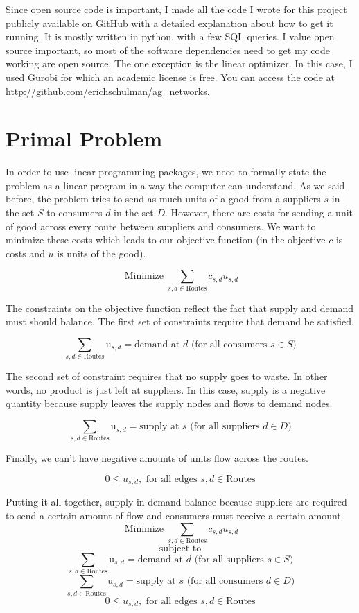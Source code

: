 \documentclass{report}
\begin{document}
Since  open source code is important, I made all the code I wrote for this project publicly available on GitHub with a detailed explanation about how to get it running. It is mostly written in python, with a few SQL queries. I value open source important, so most of the software dependencies need to get my code working are open source. The one exception is the linear optimizer. In this case, I used Gurobi for which an academic license is free. You can access the code at \url{http://github.com/erichschulman/ag_networks}.

\section{Primal Problem}

In order to use linear programming packages, we need to formally state the problem as a linear program in a way the computer can understand. As we said before, the problem tries to send as much units of a good from a suppliers $s$ in the set $S$ to consumers $d$ in the set $D$. However, there are costs for sending a unit of good across every route between suppliers and consumers. We want to minimize these costs which leads to our objective function (in the objective $c$ is costs and $u$ is units of the good). 

$$\operatorname{Minimize} \sum_{s,d \in \text{Routes}} c_{s,d} u_{s,d}$$

The constraints on the objective function reflect the fact that supply and demand must should balance. The first set of constraints require that demand be satisfied.

$$\sum_{s,d \in \text{Routes}} \text{u}_{s,d}= \text{demand at } d \text{ (for all consumers } s \in S)$$

The second set of constraint requires that no supply goes to waste. In other words, no product is just left at suppliers. In this case, supply is a negative quantity because supply leaves the supply nodes and flows to demand nodes.

$$\sum_{s,d \in \text{Routes}} \text{u}_{s,d}= \text{supply at } s \text{ (for all suppliers } d \in D)$$

Finally, we can't have negative amounts of units flow across the routes.

$$0 \leq u_{s,d},  \text{ for all edges } s,d \in \text{Routes}$$

Putting it all together, supply in demand balance because suppliers are required to send a certain amount of flow and consumers must receive a certain amount.
$$\operatorname{Minimize} \sum_{s,d \in \text{Routes}} c_{s,d} u_{s,d}$$
$$\text{subject to}$$
$$\sum_{s,d \in \text{Routes}} \text{u}_{s,d}= \text{demand at } d \text{ (for all suppliers } s \in S)$$
$$\sum_{s,d \in \text{Routes}} \text{u}_{s,d}= \text{supply at } s \text{ (for all consumers } d \in D)$$
$$0 \leq u_{s,d}, \text{ for all edges } s,d \in \text{Routes}$$
\end{document}
